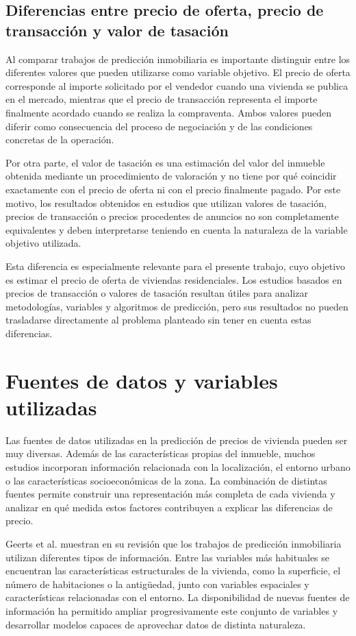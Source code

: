 \documentclass[IB]{TFUOC}%
\begin{document}
\subsection{Diferencias entre precio de oferta, precio de transacción y valor de tasación}

Al comparar trabajos de predicción inmobiliaria es importante distinguir entre los diferentes valores que pueden utilizarse como variable objetivo. El precio de oferta corresponde al importe solicitado por el vendedor cuando una vivienda se publica en el mercado, mientras que el precio de transacción representa el importe finalmente acordado cuando se realiza la compraventa. Ambos valores pueden diferir como consecuencia del proceso de negociación y de las condiciones concretas de la operación.

Por otra parte, el valor de tasación es una estimación del valor del inmueble obtenida mediante un procedimiento de valoración y no tiene por qué coincidir exactamente con el precio de oferta ni con el precio finalmente pagado. Por este motivo, los resultados obtenidos en estudios que utilizan valores de tasación, precios de transacción o precios procedentes de anuncios no son completamente equivalentes y deben interpretarse teniendo en cuenta la naturaleza de la variable objetivo utilizada.

Esta diferencia es especialmente relevante para el presente trabajo, cuyo objetivo es estimar el precio de oferta de viviendas residenciales. Los estudios basados en precios de transacción o valores de tasación resultan útiles para analizar metodologías, variables y algoritmos de predicción, pero sus resultados no pueden trasladarse directamente al problema planteado sin tener en cuenta estas diferencias.

\section{Fuentes de datos y variables utilizadas}

Las fuentes de datos utilizadas en la predicción de precios de vivienda pueden ser muy diversas. Además de las características propias del inmueble, muchos estudios incorporan información relacionada con la localización, el entorno urbano o las características socioeconómicas de la zona. La combinación de distintas fuentes permite construir una representación más completa de cada vivienda y analizar en qué medida estos factores contribuyen a explicar las diferencias de precio.

Geerts et al. \cite{houseprice_survey2023} muestran en su revisión que los trabajos de predicción inmobiliaria utilizan diferentes tipos de información. Entre las variables más habituales se encuentran las características estructurales de la vivienda, como la superficie, el número de habitaciones o la antigüedad, junto con variables espaciales y características relacionadas con el entorno. La disponibilidad de nuevas fuentes de información ha permitido ampliar progresivamente este conjunto de variables y desarrollar modelos capaces de aprovechar datos de distinta naturaleza.
\end{document}
